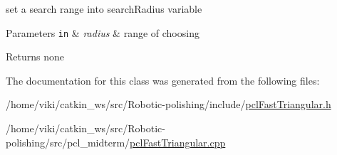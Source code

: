 set a search range into search\+Radius variable 


\begin{DoxyParams}[1]{Parameters}
\mbox{\tt in}  & {\em radius} & range of choosing \\
\hline
\end{DoxyParams}
\begin{DoxyReturn}{Returns}
none 
\end{DoxyReturn}


The documentation for this class was generated from the following files\+:\begin{DoxyCompactItemize}
\item 
/home/viki/catkin\+\_\+ws/src/\+Robotic-\/polishing/include/\hyperlink{pclFastTriangular_8h}{pcl\+Fast\+Triangular.\+h}\item 
/home/viki/catkin\+\_\+ws/src/\+Robotic-\/polishing/src/pcl\+\_\+midterm/\hyperlink{pclFastTriangular_8cpp}{pcl\+Fast\+Triangular.\+cpp}\end{DoxyCompactItemize}
